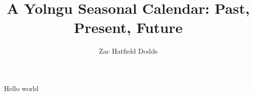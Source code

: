 \documentclass[11pt]{report}
\title{{\Huge A Yolngu Seasonal Calendar:} \newline Past, Present, Future}
\author{Zac Hatfield Dodds}
\date{}
\begin{document}
\maketitle
\tableofcontents
\listoffigures

Hello world \cite{clarke2009}












\end{document}
